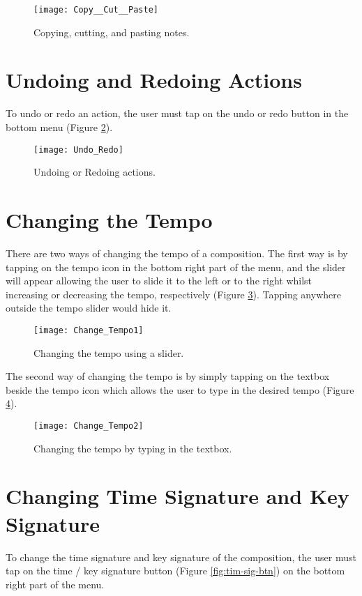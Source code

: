 \begin{figure}[H]
  \centering
  \texttt{[image: Copy\_\_Cut\_\_Paste]}
    \caption{Copying, cutting, and pasting notes.}
    \label{fig:copy-cut-paste}
\end{figure}

\section{Undoing and Redoing Actions}
To undo or redo an action, the user must tap on the undo or redo button in the bottom menu (Figure \ref{fig:undo-redo}).

\begin{figure}[H]
  \centering
  \texttt{[image: Undo\_Redo]}
    \caption{Undoing or Redoing actions.}
    \label{fig:undo-redo}
\end{figure}

\section{Changing the Tempo}
There are two ways of changing the tempo of a composition. The first way is by tapping on the tempo icon in the bottom right part of the menu, and the slider will appear allowing the user to slide it to the left or to the right whilst increasing or decreasing the tempo, respectively (Figure \ref{fig:tempo-slider}). Tapping anywhere outside the tempo slider would hide it.

\begin{figure}[H]
  \centering
  \texttt{[image: Change\_Tempo1]}
    \caption{Changing the tempo using a slider.}
    \label{fig:tempo-slider}
\end{figure}

The second way of changing the tempo is by simply tapping on the textbox beside the tempo icon which allows the user to type in the desired tempo (Figure \ref{fig:tempo-type}).

\begin{figure}[H]
  \centering
  \texttt{[image: Change\_Tempo2]}
    \caption{Changing the tempo by typing in the textbox.}
    \label{fig:tempo-type}
\end{figure}

\section{Changing Time Signature and Key Signature}
To change the time signature and key signature of the composition, the user must tap on the time / key signature button (Figure \ref{fig:tim-sig-btn}) on the bottom right part of the menu.

